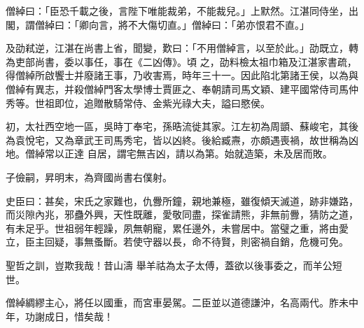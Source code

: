 \begin{pinyinscope}
 僧綽曰：「臣恐千載之後，言陛下唯能裁弟，不能裁兒。」上默然。江湛同侍坐，出閣，謂僧綽曰：「卿向言，將不大傷切直。」僧綽曰：「弟亦恨君不直。」



 及劭弒逆，江湛在尚書上省，聞變，歎曰：「不用僧綽言，以至於此。」劭既立，轉為吏部尚書，委以事任，事在《二凶傳》。頃
 之，劭料檢太祖巾箱及江湛家書疏，得僧綽所啟饗士并廢諸王事，乃收害焉，時年三十一。因此陷北第諸王侯，以為與僧綽有異志，并殺僧綽門客太學博士賈匪之、奉朝請司馬文穎、建平國常侍司馬仲秀等。世祖即位，追贈散騎常侍、金紫光祿大夫，謚曰愍侯。



 初，太社西空地一區，吳時丁奉宅，孫晧流徙其家。江左初為周顗、蘇峻宅，其後為袁悅宅，又為章武王司馬秀宅，皆以凶終。後給臧燾，亦頗遇喪禍，故世稱為凶地。僧綽常以正達
 自居，謂宅無吉凶，請以為第。始就造築，未及居而敗。



 子儉嗣，昇明末，為齊國尚書右僕射。



 史臣曰：甚矣，宋氏之家難也，仇釁所鐘，親地兼極，雖復傾天滅道，跡非嫌路，而災隙內兆，邪蠱外興，天性既離，愛敬同盡，探雀請熊，非無前釁，猜防之道，有未足乎。世祖弱年輕躁，夙無朝寵，累任邊外，未嘗居中。當璧之重，將由愛立，臣主回疑，事無蚤斷。若使守器以長，命不待賢，則密禍自銷，危機可免。



 聖哲之訓，豈欺我哉！昔山濤
 舉羊祜為太子太傅，蓋欲以後事委之，而羊公短世。



 僧綽綢繆主心，將任以國重，而宮車晏駕。二臣並以道德謙沖，名高兩代。胙未中年，功謝成日，惜矣哉！



\end{pinyinscope}